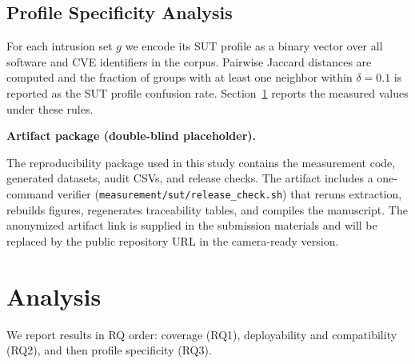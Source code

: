 \documentclass[sigconf,anonymous,review]{acmart}
\newcommand{\myparagraph}[1]{\textbf{#1.}\hspace{0.5em}}
\begin{document}
\subsection{Profile Specificity Analysis}

For each intrusion set $g$ we encode its SUT profile as a binary vector over all software and CVE identifiers in the corpus. Pairwise Jaccard distances are computed and the fraction of groups with at least one neighbor within $\delta = 0.1$ is reported as the SUT profile confusion rate. Section~\ref{sec:analysis} reports the measured values under these rules.

\myparagraph{Artifact package (double-blind placeholder)}

The reproducibility package used in this study contains the measurement code, generated datasets, audit CSVs, and release checks. The artifact includes a one-command verifier (\texttt{measurement/sut/release\_check.sh}) that reruns extraction, rebuilds figures, regenerates traceability tables, and compiles the manuscript. The anonymized artifact link is supplied in the submission materials and will be replaced by the public repository URL in the camera-ready version.


\section{Analysis}\label{sec:analysis}


We report results in RQ order: coverage (RQ1), deployability and compatibility (RQ2), and then profile specificity (RQ3).
\end{document}

